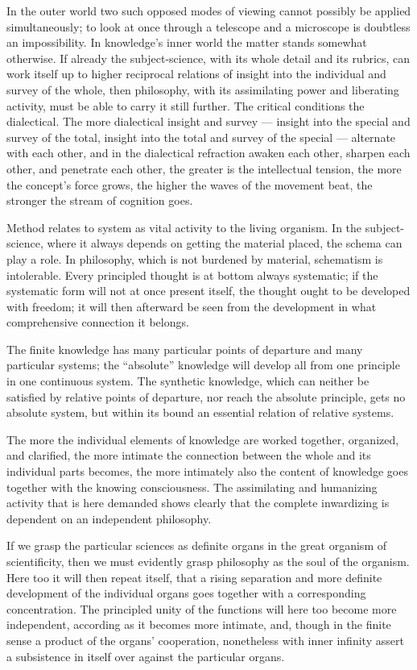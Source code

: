 \documentclass[12pt]{book}
\begin{document}
In the outer world two such opposed modes of viewing cannot possibly be applied simultaneously; to look
at once through a telescope and a microscope is doubtless an impossibility. In knowledge's inner world the
matter stands somewhat otherwise. If already the subject-science, with its whole detail and its rubrics,
can work itself up to higher reciprocal relations of insight into the individual and survey of the whole,
then philosophy, with its assimilating power and liberating activity, must be able to carry it still
further. The critical conditions the dialectical. The more dialectical insight and survey — insight into
the special and survey of the total, insight into the total and survey of the special — alternate with
each other, and in the dialectical refraction awaken each other, sharpen each other, and penetrate each
other, the greater is the intellectual tension, the more the concept's force grows, the higher the waves
of the movement beat, the stronger the stream of cognition goes.

Method relates to system as vital activity to the living organism. In the subject-science, where it
always depends on getting the material placed, the schema can play a role. In philosophy, which is not
burdened by material, schematism is intolerable. Every principled thought is at bottom always systematic;
if the systematic form will not at once present itself, the thought ought to be developed with freedom; it
will then afterward be seen from the development in what comprehensive connection it belongs.

The finite knowledge has many particular points of departure and many particular systems; the
``absolute'' knowledge will develop all from one principle in one continuous system. The synthetic
knowledge, which can neither be satisfied by relative points of departure, nor reach the absolute
principle, gets no absolute system, but within its bound an essential relation of relative systems.

The more the individual elements of knowledge are worked together, organized, and clarified, the more
intimate the connection between the whole and its individual parts becomes, the more intimately also the
content of knowledge goes together with the knowing consciousness. The assimilating and humanizing
activity that is here demanded shows clearly that the complete inwardizing is dependent on an independent
philosophy.

If we grasp the particular sciences as definite organs in the great organism of scientificity, then we
must evidently grasp philosophy as the soul of the organism. Here too it will then repeat itself, that a
rising separation and more definite development of the individual organs goes together with a
corresponding concentration. The principled unity of the functions will here too become more independent,
according as it becomes more intimate, and, though in the finite sense a product of the organs'
cooperation, nonetheless with inner infinity assert a subsistence in itself over against the particular
organs.
\end{document}
